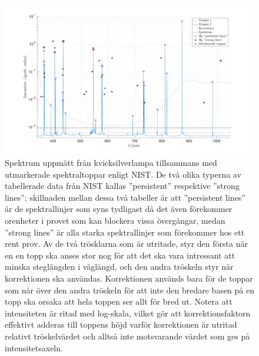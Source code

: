 \documentclass[11pt,a4paper]{article}
\begin{document}
\begin{figure}\centering
\centerline{ %
\includegraphics[width=1.2\textwidth]{Hg_spektrum.pdf}
}
\caption{Spektrum uppmätt från kvicksilverlampa tillsammans med
  utmarkerade spektraltoppar enligt NIST\cite{NIST}. De två olika
  typerna av tabellerade data från NIST kallas ''persistent''
  respektive ''strong lines''; skillnaden mellan dessa två tabeller är
  att ''persistent lines'' är de spektrallinjer som syns tydligast
  då det även förekommer orenheter i provet som kan blockera vissa
  övergångar, medan ''strong lines'' är alla starka spektrallinjer som
  förekommer hos ett rent prov.
  Av de två trösklarna som är utritade, styr den första när en en topp
  ska anses stor nog för att det ska vara intressant att minska
  steglängden i våglängd, och den andra tröskeln styr när korrektionen
  ska användas. Korrektionen används bara för de toppar som når över
  den andra tröskeln för att inte den bredare basen på en topp ska
  orsaka att hela toppen ser allt för bred ut. Notera att intensiteten
  är ritad med log-skala, vilket gör att korrektionsfaktorn effektivt
  adderas till toppens höjd varför korrektionen är utritad relativt
  tröskelvärdet och alltså inte motsvarande värdet som ges på
  intensitetsaxeln. 
}
\label{fig:Hg_spektrum} 
\end{figure}
\restoregeometry
\end{document}
